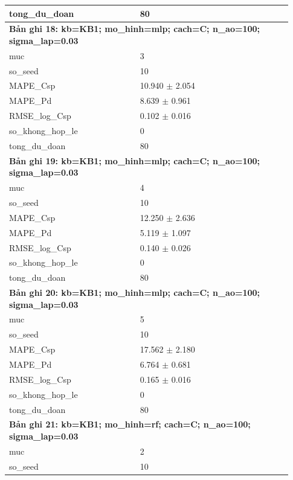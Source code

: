 \begin{longtable}{p{0.43\linewidth}p{0.50\linewidth}}
tong\_\allowbreak du\_\allowbreak doan & 80 \\
\midrule
\multicolumn{2}{p{0.95\linewidth}}{\textbf{Bản ghi 18: kb=KB1; mo\_hinh=mlp; cach=C; n\_ao=100; sigma\_lap=0.03}} \\
muc & 3 \\
so\_\allowbreak seed & 10 \\
MAPE\_\allowbreak Csp & 10.940 $\pm$ 2.054 \\
MAPE\_\allowbreak Pd & 8.639 $\pm$ 0.961 \\
RMSE\_\allowbreak log\_\allowbreak Csp & 0.102 $\pm$ 0.016 \\
so\_\allowbreak khong\_\allowbreak hop\_\allowbreak le & 0 \\
tong\_\allowbreak du\_\allowbreak doan & 80 \\
\midrule
\multicolumn{2}{p{0.95\linewidth}}{\textbf{Bản ghi 19: kb=KB1; mo\_hinh=mlp; cach=C; n\_ao=100; sigma\_lap=0.03}} \\
muc & 4 \\
so\_\allowbreak seed & 10 \\
MAPE\_\allowbreak Csp & 12.250 $\pm$ 2.636 \\
MAPE\_\allowbreak Pd & 5.119 $\pm$ 1.097 \\
RMSE\_\allowbreak log\_\allowbreak Csp & 0.140 $\pm$ 0.026 \\
so\_\allowbreak khong\_\allowbreak hop\_\allowbreak le & 0 \\
tong\_\allowbreak du\_\allowbreak doan & 80 \\
\midrule
\multicolumn{2}{p{0.95\linewidth}}{\textbf{Bản ghi 20: kb=KB1; mo\_hinh=mlp; cach=C; n\_ao=100; sigma\_lap=0.03}} \\
muc & 5 \\
so\_\allowbreak seed & 10 \\
MAPE\_\allowbreak Csp & 17.562 $\pm$ 2.180 \\
MAPE\_\allowbreak Pd & 6.764 $\pm$ 0.681 \\
RMSE\_\allowbreak log\_\allowbreak Csp & 0.165 $\pm$ 0.016 \\
so\_\allowbreak khong\_\allowbreak hop\_\allowbreak le & 0 \\
tong\_\allowbreak du\_\allowbreak doan & 80 \\
\midrule
\multicolumn{2}{p{0.95\linewidth}}{\textbf{Bản ghi 21: kb=KB1; mo\_hinh=rf; cach=C; n\_ao=100; sigma\_lap=0.03}} \\
muc & 2 \\
so\_\allowbreak seed & 10 \\

\end{longtable}
